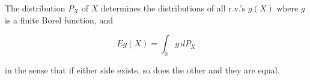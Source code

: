 The distribution $P_X$ of $X$ determines the distributions of all r.v.'s $g(X)$ where $g$ is a finite Borel function, and

$$E g(X) = \int_{\mathbb{R}} g \, dP_X$$

in the sense that if either side exists, so does the other and they are equal.
